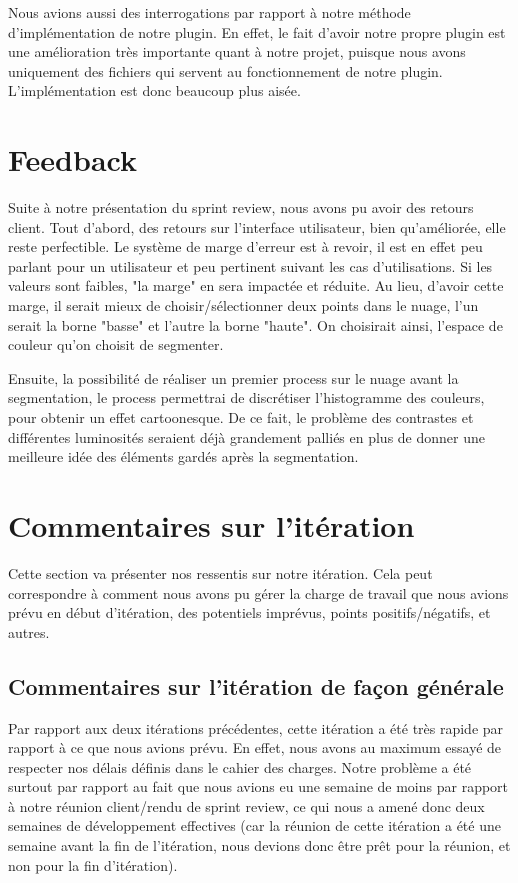 \documentclass[12pt,titlepage,french]{article}
\begin{document}
Nous avions aussi des interrogations par rapport à notre méthode d'implémentation de notre plugin. En effet, le fait d'avoir notre propre plugin est une amélioration très importante quant à notre projet, puisque nous avons uniquement des fichiers qui servent au fonctionnement de notre plugin. L'implémentation est donc beaucoup plus aisée.

\section{Feedback}

Suite à notre présentation du sprint review, nous avons pu avoir des retours client. Tout d'abord, des retours sur l'interface utilisateur, bien qu'améliorée, elle reste perfectible. Le système de marge d'erreur est à revoir, il est en effet peu parlant pour un utilisateur et peu pertinent suivant les cas d'utilisations. Si les valeurs sont faibles, "la marge" en sera impactée et réduite. Au lieu, d'avoir cette marge, il serait mieux de choisir/sélectionner deux points dans le nuage, l'un serait la borne "basse" et l'autre la borne "haute". On choisirait ainsi, l'espace de couleur qu'on choisit de segmenter.

Ensuite, la possibilité de réaliser un premier process sur le nuage avant la segmentation, le process permettrai de discrétiser l'histogramme des couleurs, pour obtenir un effet cartoonesque. De ce fait, le problème des contrastes et différentes luminosités seraient déjà grandement palliés en plus de donner une meilleure idée des éléments gardés après la segmentation.

\section{Commentaires sur l'itération}

Cette section va présenter nos ressentis sur notre itération. Cela peut correspondre à comment nous avons pu gérer la charge de travail que nous avions prévu en début d'itération, des potentiels imprévus, points positifs/négatifs, et autres.

\subsection{Commentaires sur l'itération de façon générale}

Par rapport aux deux itérations précédentes, cette itération a été très rapide par rapport à ce que nous avions prévu. En effet, nous avons au maximum essayé de respecter nos délais définis dans le cahier des charges. Notre problème a été surtout par rapport au fait que nous avions eu une semaine de moins par rapport à notre réunion client/rendu de sprint review, ce qui nous a amené donc deux semaines de développement effectives (car la réunion de cette itération a été une semaine avant la fin de l'itération, nous devions donc être prêt pour la réunion, et non pour la fin d'itération). \newline
\end{document}
